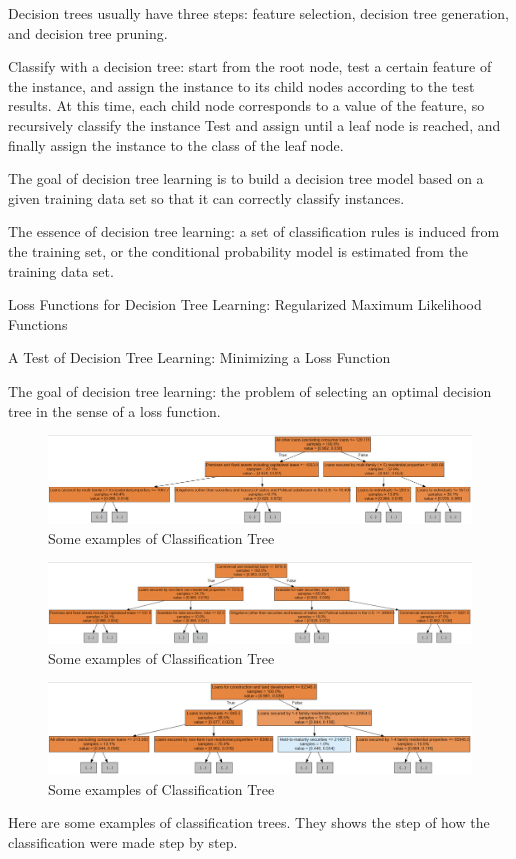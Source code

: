 \documentclass[11pt]{report}
\begin{document}
Decision trees usually have three steps: feature selection, decision tree generation, and decision tree pruning.

Classify with a decision tree: start from the root node, test a certain feature of the instance, and assign the instance to its child nodes according to the test results. At this time, each child node corresponds to a value of the feature, so recursively classify the instance Test and assign until a leaf node is reached, and finally assign the instance to the class of the leaf node.

The goal of decision tree learning is to build a decision tree model based on a given training data set so that it can correctly classify instances.

The essence of decision tree learning: a set of classification rules is induced from the training set, or the conditional probability model is estimated from the training data set.

Loss Functions for Decision Tree Learning: Regularized Maximum Likelihood Functions

A Test of Decision Tree Learning: Minimizing a Loss Function

The goal of decision tree learning: the problem of selecting an optimal decision tree in the sense of a loss function.

\begin{figure}[h]
     \centering
     \includegraphics[width = \linewidth]{tree_1.png}
     \caption{Some examples of Classification Tree}\label{fig:tree_1}
\end{figure}

\begin{figure}[h]
     \centering
     \includegraphics[width = \linewidth]{tree_2.png}
     \caption{Some examples of Classification Tree}\label{fig:tree_2}
\end{figure}

\begin{figure}[h]
     \centering
     \includegraphics[width = \linewidth]{tree_3.png}
     \caption{Some examples of Classification Tree}\label{fig:tree_3}
\end{figure}
Here are some examples of classification trees. They shows the step of how the classification were made step by step.
\end{document}
